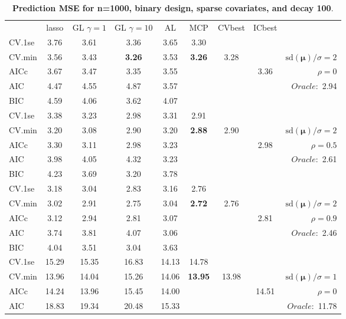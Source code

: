 \clearpage
\begin{table}\vspace{-.5cm}
\caption[l]{ { \bf Prediction MSE for n=1000, binary design, 
sparse covariates, and  decay  100}.}
\vspace{-.5cm}
\footnotesize{}
\begin{center}
\begin{tabular}{l*{7}{c}|r}
 & lasso & GL $\gamma=1$ & GL $\gamma=10$ & AL & MCP  & CVbest & ICbest  \\
\cline{1-9}
CV.1se & 3.76 & 3.61 & 3.36 & 3.65 & 3.30 & & & \\
CV.min & 3.56 & 3.43 & {\bf 3.26} & 3.53 & {\bf 3.26} & 3.28 & & $\mathrm{sd}(\mathbf{\mu})/\sigma=2$ \\
AICc & 3.67 & 3.47 & 3.35 & 3.55 & & & 3.36 &  $\rho=0$ \\
AIC & 4.47 & 4.55 & 4.87 & 3.57 & & & &  \multirow{2}{*}{$Oracle: $ 2.94} \\
BIC & 4.59 & 4.06 & 3.62 & 4.07 & & & &  \\
 \hline 
CV.1se & 3.38 & 3.23 & 2.98 & 3.31 & 2.91 & & & \\
CV.min & 3.20 & 3.08 & 2.90 & 3.20 & {\bf 2.88} & 2.90 & & $\mathrm{sd}(\mathbf{\mu})/\sigma=2$ \\
AICc & 3.30 & 3.11 & 2.98 & 3.23 & & & 2.98 &  $\rho=0.5$ \\
AIC & 3.98 & 4.05 & 4.32 & 3.23 & & & &  \multirow{2}{*}{$Oracle: $ 2.61} \\
BIC & 4.23 & 3.69 & 3.20 & 3.78 & & & &  \\
 \hline 
CV.1se & 3.18 & 3.04 & 2.83 & 3.16 & 2.76 & & & \\
CV.min & 3.02 & 2.91 & 2.75 & 3.04 & {\bf 2.72} & 2.76 & & $\mathrm{sd}(\mathbf{\mu})/\sigma=2$ \\
AICc & 3.12 & 2.94 & 2.81 & 3.07 & & & 2.81 &  $\rho=0.9$ \\
AIC & 3.74 & 3.81 & 4.07 & 3.06 & & & &  \multirow{2}{*}{$Oracle: $ 2.46} \\
BIC & 4.04 & 3.51 & 3.04 & 3.63 & & & &  \\
 \hline 
CV.1se & 15.29 & 15.35 & 16.83 & 14.13 & 14.78 & & & \\
CV.min & 13.96 & 14.04 & 15.26 & 14.06 & {\bf 13.95} & 13.98 & & $\mathrm{sd}(\mathbf{\mu})/\sigma=1$ \\
AICc & 14.24 & 13.96 & 15.45 & 14.00 & & & 14.51 &  $\rho=0$ \\
AIC & 18.83 & 19.34 & 20.48 & 15.33 & & & &  \multirow{2}{*}{$Oracle: $ 11.78} \\

\end{tabular}
\end{center}
\end{table}
